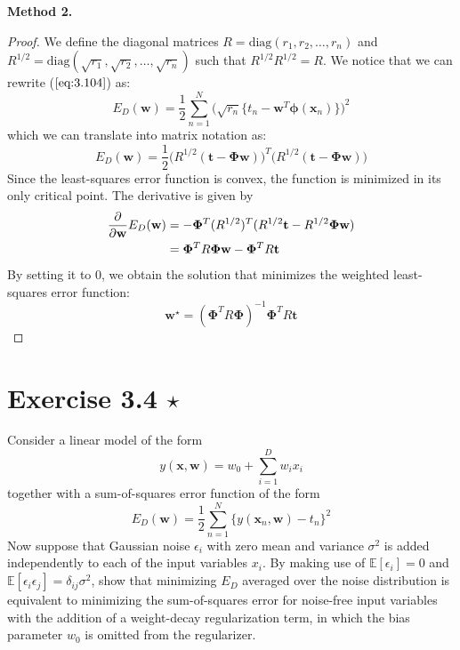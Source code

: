 \textbf{Method 2.}
\begin{proof}

    We define the diagonal matrices $R = \text{diag}(r_1, r_2, \ldots, r_n)$ and
    $R^{1/2} = \text{diag}(\sqrt{r_1}, \sqrt{r_2}, \ldots, \sqrt{r_n})$
    such that $R^{1/2}R^{1/2} = R$. We notice that we can rewrite ($\ref{eq:3.104}$) as:
    \[
        E_D(\mathbf{w}) = \frac{1}{2} \sum_{n=1}^{N} 
        \big(\sqrt{r_n}\{t_n - \mathbf{w}^T \bm{\phi}(\mathbf{x}_n)\}\big)^2
    \] 
    which we can translate into matrix notation as:
    \[
        E_D(\mathbf{w}) = \frac{1}{2} \big(R^{1/2}(\mathbf{t} - \mathbf{\Phi}\mathbf{w})\big)^T
        \big(R^{1/2}(\mathbf{t} - \mathbf{\Phi}\mathbf{w})\big)
    \] 
    Since the least-squares error function is convex, the function
    is minimized in its only critical point. The derivative is given by
    \begin{align*}
        \pdv{\mathbf{w}} E_D(\mathbf{w})
        &= -\mathbf{\Phi}^T(R^{1/2})^T(R^{1/2}\mathbf{t} - R^{1/2}\mathbf{\Phi}\mathbf{w}) \\
        &= \mathbf{\Phi}^TR\mathbf{\Phi}\mathbf{w} - \mathbf{\Phi}^TR\mathbf{t}
    \end{align*}
    By setting it to 0, we obtain the solution that minimizes the weighted
    least-squares error function:
    \[
        \mathbf{w}^\star = (\mathbf{\Phi}^TR\mathbf{\Phi})^{-1} \mathbf{\Phi}^T R \mathbf{t} 
    \] 
\end{proof}

\section*{Exercise 3.4 $\star$}
Consider a linear model of the form
\begin{equation}\label{eq:3.105}\tag{3.105}
    y(\mathbf{x}, \mathbf{w}) = w_0 + \sum_{i=1}^{D} w_ix_i
\end{equation}
together with a sum-of-squares error function of 
the form
\begin{equation}\label{eq:3.106}\tag{3.106}
    E_D(\mathbf{w}) = \frac{1}{2} \sum_{n=1}^{N}
    \{y(\mathbf{x}_n, \mathbf{w}) - t_n\}^2
\end{equation}
Now suppose that Gaussian noise $\epsilon_i$ with zero
mean and variance $\sigma^2$ is added independently
to each of the input variables $x_i$. By making
use of $\mathbb{E}[\epsilon_i] = 0$ and 
$\mathbb{E}[\epsilon_i\epsilon_j] = \delta_{ij}\sigma^2$,
show that minimizing $E_D$ averaged over the noise 
distribution is equivalent to minimizing the 
sum-of-squares error for noise-free input variables
with the addition of a weight-decay regularization term,
in which the bias parameter $w_0$ is omitted from
the regularizer.

